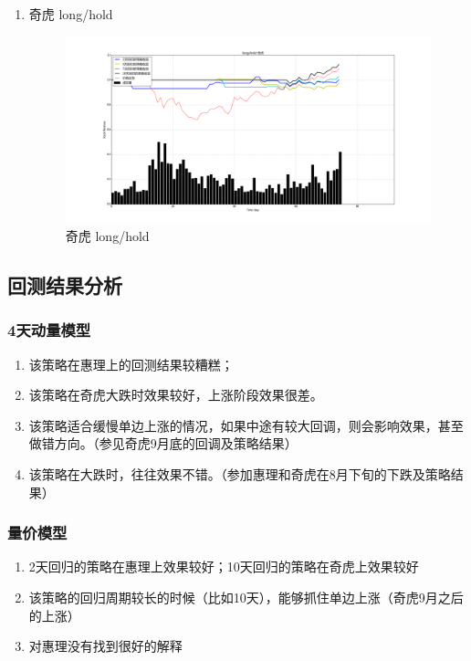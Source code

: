 \documentclass[12pt,a4paper]{article}
\begin{document}
\begin{enumerate}[1.]
\item 奇虎 long/hold

\begin{figure}[H]
	\centering
	\includegraphics[width=1.0\textwidth]{img_r_5/hold/qihu.png}
	\caption{奇虎 long/hold}
\end{figure}

\end{enumerate}





\subsection{回测结果分析}

\subsubsection{4天动量模型}

\begin{enumerate}
\item 该策略在惠理上的回测结果较糟糕；
\item 该策略在奇虎大跌时效果较好，上涨阶段效果很差。
\item 该策略适合缓慢单边上涨的情况，如果中途有较大回调，则会影响效果，甚至做错方向。（参见奇虎9月底的回调及策略结果）
\item 该策略在大跌时，往往效果不错。（参加惠理和奇虎在8月下旬的下跌及策略结果）

\end{enumerate}
\subsubsection{量价模型}
\begin{enumerate}
\item 2天回归的策略在惠理上效果较好；10天回归的策略在奇虎上效果较好
\item 该策略的回归周期较长的时候（比如10天），能够抓住单边上涨（奇虎9月之后的上涨）
\item 对惠理没有找到很好的解释

\end{enumerate}
\end{document}
